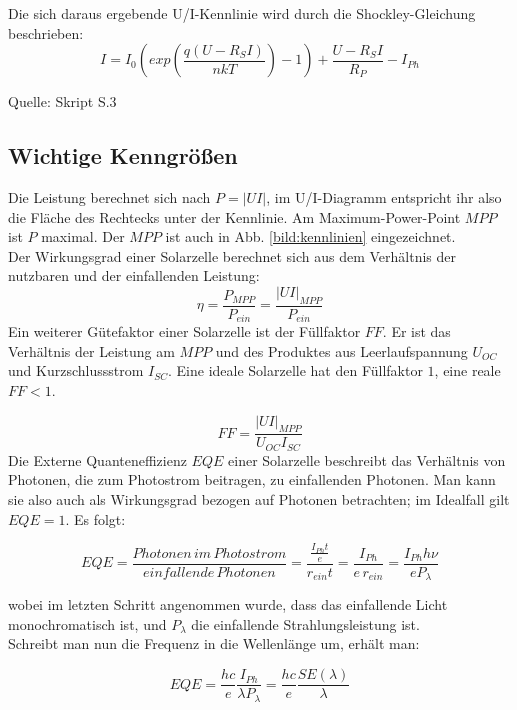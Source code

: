 Die sich daraus ergebende U/I-Kennlinie wird durch die Shockley-Gleichung beschrieben:
\begin{equation}
    I = I_0 (exp(\frac{q(U-R_SI)}{nkT})-1) + \frac{U-R_SI}{R_P} - I_{Ph}
\end{equation}

Quelle: Skript S.3

\subsection{Wichtige Kenngrößen}
Die Leistung berechnet sich nach $P = |UI|$, im U/I-Diagramm entspricht ihr also die Fläche des Rechtecks unter der Kennlinie. Am Maximum-Power-Point $MPP$ ist $P$ maximal. Der $MPP$ ist auch in Abb. \ref{bild:kennlinien} eingezeichnet. \\
Der Wirkungsgrad einer Solarzelle berechnet sich aus dem Verhältnis der nutzbaren und der einfallenden Leistung:
\begin{equation*}
\eta = \frac{P_{MPP}}{P_{ein}} = \frac{|UI|_{MPP}}{P_{ein}}
\end{equation*}
Ein weiterer Gütefaktor einer Solarzelle ist der Füllfaktor $FF$. Er ist das Verhältnis der Leistung am $MPP$ und des Produktes aus Leerlaufspannung $U_{OC}$ und Kurzschlussstrom $I_{SC}$. Eine ideale Solarzelle hat den Füllfaktor $1$, eine reale $FF < 1$.

\begin{equation*}
FF = \frac{|UI|_{MPP}}{U_{OC} I_{SC}}
\end{equation*}
Die Externe Quanteneffizienz $EQE$ einer Solarzelle beschreibt das Verhältnis von Photonen, die zum Photostrom beitragen, zu einfallenden Photonen. Man kann sie also auch als Wirkungsgrad bezogen auf Photonen betrachten; im Idealfall gilt $EQE = 1$. Es folgt:

\begin{equation}
EQE = \frac{Photonen \, im \, Photostrom}{einfallende \, Photonen} = \frac{ \frac{I_{Ph}t}{e}}{r_{ein}t} = \frac{I_{Ph}}{e \, r_{ein}} = \frac{I_{Ph} h \nu}{e P_\lambda}
\end{equation}

wobei im letzten Schritt angenommen wurde, dass das einfallende Licht monochromatisch ist, und $P_\lambda$ die einfallende Strahlungsleistung ist. \\
Schreibt man nun die Frequenz in die Wellenlänge um, erhält man:

\begin{equation}
EQE = \frac{h c}{e} \frac{I_{Ph}}{\lambda P_\lambda} = \frac{h c}{e} \frac{SE(\lambda)}{\lambda}
\end{equation}

